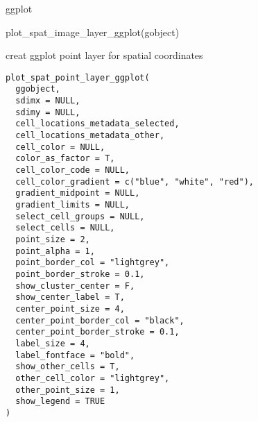 \documentclass[a4paper]{book}
\begin{document}
%
\begin{Value}
ggplot
\end{Value}
%
\begin{Examples}
\begin{ExampleCode}
    plot_spat_image_layer_ggplot(gobject)
\end{ExampleCode}
\end{Examples}
%
\begin{Description}\relax
creat ggplot point layer for spatial coordinates
\end{Description}
%
\begin{Usage}
\begin{verbatim}
plot_spat_point_layer_ggplot(
  ggobject,
  sdimx = NULL,
  sdimy = NULL,
  cell_locations_metadata_selected,
  cell_locations_metadata_other,
  cell_color = NULL,
  color_as_factor = T,
  cell_color_code = NULL,
  cell_color_gradient = c("blue", "white", "red"),
  gradient_midpoint = NULL,
  gradient_limits = NULL,
  select_cell_groups = NULL,
  select_cells = NULL,
  point_size = 2,
  point_alpha = 1,
  point_border_col = "lightgrey",
  point_border_stroke = 0.1,
  show_cluster_center = F,
  show_center_label = T,
  center_point_size = 4,
  center_point_border_col = "black",
  center_point_border_stroke = 0.1,
  label_size = 4,
  label_fontface = "bold",
  show_other_cells = T,
  other_cell_color = "lightgrey",
  other_point_size = 1,
  show_legend = TRUE
)
\end{verbatim}
\end{Usage}
%
\end{document}
